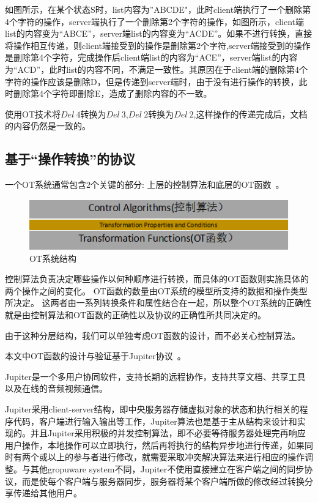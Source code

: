 如图所示，在某个状态S时，list内容为”ABCDE"，此时client端执行了一个删除第4个字符的操作，server端执行了一个删除第2个字符的操作，如图所示，client端list的内容变为“ABCE”，server端list的内容变为“ACDE”。如果不进行转换，直接将操作相互传递，则client端接受到的操作是删除第2个字符,server端接受到的操作是删除第4个字符，完成操作后client端list的内容为“ACE”，server端list的内容为“ACD”，此时list的内容不同，不满足一致性。其原因在于client端的删除第4个字符的操作应该是删除D，但是传递到server端时，由于没有进行操作的转换，此时删除第4个字符即删除E，造成了删除内容的不一致。

使用OT技术将$Del\ 4$转换为$Del\ 3$,$Del\ 2$转换为$Del\ 2$,这样操作的传递完成后，文档的内容仍然是一致的。

\subsection{基于``操作转换''的协议}
一个OT系统通常包含2个关键的部分: 上层的控制算法和底层的OT函数~\cite{}。

\begin{figure}[H]
\centering
\includegraphics{figures/structure.bmp}
\caption{OT系统结构}
\end{figure}

控制算法负责决定哪些操作以何种顺序进行转换，而具体的OT函数则实施具体的两个操作之间的变化。
OT函数的数量由OT系统的模型所支持的数据和操作类型所决定。
这两者由一系列转换条件和属性结合在一起，所以整个OT系统的正确性就是由控制算法和OT函数的正确性以及协议的正确性所共同决定的。

由于这种分层结构，我们可以单独考虑OT函数的设计，而不必关心控制算法。

本文中OT函数的设计与验证基于Jupiter协议~\cite{Nichols:UIST95}。

Jupiter是一个多用户协同软件，支持长期的远程协作，支持共享文档、共享工具以及在线的音频视频通信。

Jupiter采用client-server结构，即中央服务器存储虚拟对象的状态和执行相关的程序代码，客户端进行输入输出等工作，Jupiter算法也是基于主从结构来设计和实现的。并且Jupiter采用积极的并发控制算法，即不必要等待服务器处理完再响应用户操作，本地操作可以立即执行，然后再将执行的结构异步地进行传递，如果同时有两个或以上的参与者进行修改，就需要采取冲突解决算法来进行相应的操作调整。与其他gropuware system不同，Jupiter不使用直接建立在客户端之间的同步协议，而是使每个客户端与服务器同步，服务器将某个客户端所做的修改经过转换分享传递给其他用户。


